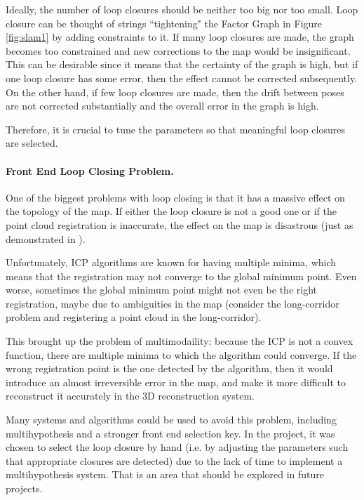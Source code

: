 \documentclass[11pt]{article}
\begin{document}
Ideally, the number of loop closures should be neither too big nor too small. Loop closure can be thought of strings ``tightening" the Factor Graph in Figure \ref{fig:slam1} by adding constraints to it. If many loop closures are made, the graph becomes too constrained and new corrections to the map would be insignificant. This can be desirable since it means that the certainty of the graph is high, but if one loop closure has some error, then the effect cannot be corrected subsequently. On the other hand, if few loop closures are made, then the drift between poses are not corrected substantially and the overall error in the graph is high.
	
Therefore, it is crucial to tune the parameters so that meaningful loop closures are selected. 

\paragraph{Front End Loop Closing Problem.} One of the biggest problems with loop closing is that it has a massive effect on the topology of the map. If either the loop closure is not a good one or if the point cloud registration is inaccurate, the effect on the map is disastrous (just as demonstrated in \cite{latif2013robust}).
	
Unfortunately, ICP algorithms are known for having multiple minima, which means that the registration may not converge to the global minimum point. Even worse, sometimes the global minimum point might not even be the right registration, maybe due to ambiguities in the map (consider the long-corridor problem and registering a point cloud in the long-corridor).
	
This brought up the problem of multimodaility: because the ICP is not a convex function, there are multiple minima to which the algorithm could converge. If the wrong registration point is the one detected by the algorithm, then it would introduce an almost irreversible error in the map, and make it more difficult to reconstruct it accurately in the 3D reconstruction system.
	
Many systems and algorithms could be used to avoid this problem, including multihypothesis and a stronger front end selection key. In the project, it was chosen to select the loop closure by hand (i.e. by adjusting the parameters such that appropriate closures are detected) due to the lack of time to implement a multihypothesis system. That is an area that should be explored in future projects.
\end{document}
